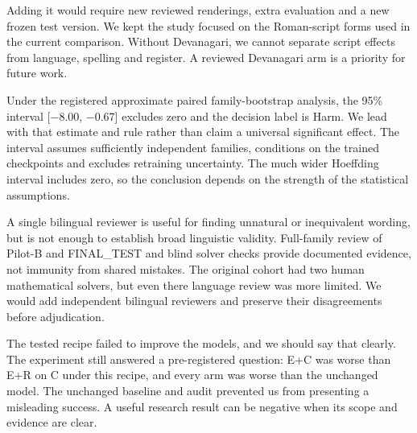 \medskip{}\par\nopagebreak

Adding it would require new reviewed renderings, extra evaluation and a new frozen test version. We kept the study focused on the Roman-script forms used in the current comparison. Without Devanagari, we cannot separate script effects from language, spelling and register. A reviewed Devanagari arm is a priority for future work.

\medskip{}\par\nopagebreak

Under the registered approximate paired family-bootstrap analysis, the 95\% interval [−8.00, −0.67] excludes zero and the decision label is Harm. We lead with that estimate and rule rather than claim a universal significant effect. The interval assumes sufficiently independent families, conditions on the trained checkpoints and excludes retraining uncertainty. The much wider Hoeffding interval includes zero, so the conclusion depends on the strength of the statistical assumptions.

\medskip{}\par\nopagebreak

A single bilingual reviewer is useful for finding unnatural or inequivalent wording, but is not enough to establish broad linguistic validity. Full-family review of Pilot-B and FINAL\_TEST and blind solver checks provide documented evidence, not immunity from shared mistakes. The original cohort had two human mathematical solvers, but even there language review was more limited. We would add independent bilingual reviewers and preserve their disagreements before adjudication.

\medskip{}\par\nopagebreak

The tested recipe failed to improve the models, and we should say that clearly. The experiment still answered a pre-registered question: E+C was worse than E+R on C under this recipe, and every arm was worse than the unchanged model. The unchanged baseline and audit prevented us from presenting a misleading success. A useful research result can be negative when its scope and evidence are clear.

